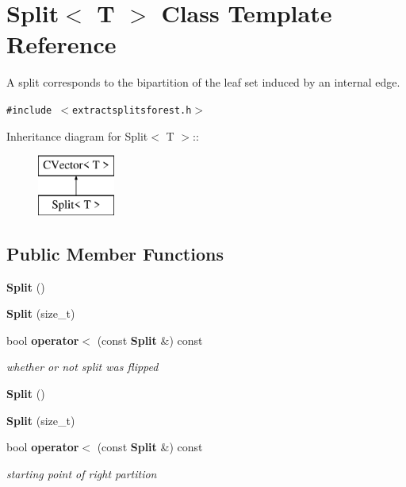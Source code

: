 \section{Split$<$ T $>$ Class Template Reference}
\label{classSplit}
A split corresponds to the bipartition of the leaf set induced by an internal edge.  


{\tt \#include $<$extractsplitsforest.h$>$}

Inheritance diagram for Split$<$ T $>$::\begin{figure}[H]
\begin{center}
\leavevmode
\includegraphics[height=2cm]{classSplit}
\end{center}
\end{figure}
\subsection*{Public Member Functions}
\begin{CompactItemize}
\item 
{\bf Split} ()
\item 
{\bf Split} (size\_\-t)
\item 
bool {\bf operator$<$} (const {\bf Split} \&) const 
\begin{CompactList}\small\item\em whether or not split was flipped \item\end{CompactList}\item 
{\bf Split} ()
\item 
{\bf Split} (size\_\-t)
\item 
bool {\bf operator$<$} (const {\bf Split} \&) const 
\begin{CompactList}\small\item\em starting point of right partition \item\end{CompactList}\end{CompactItemize}
